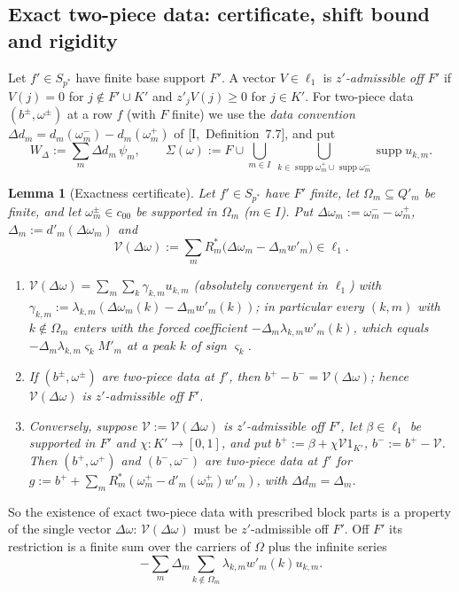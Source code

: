 \documentclass[10pt]{amsart}
\newtheorem{lemma}[theorem]{Lemma}
\theoremstyle{definition}
\theoremstyle{remark}
\newcommand{\supp}{\operatorname{supp}}
\begin{document}
\subsection{Exact two-piece data: certificate, shift bound and rigidity}\label{subsec:II-rigid}

Let $f'\in S_{p^*}$ have finite base support $F'$.  A vector $V\in\ell_1$ is
\emph{$z'$-admissible off $F'$} if $V(j)=0$ for $j\notin F'\cup K'$ and
$z'_jV(j)\ge0$ for $j\in K'$.  For two-piece data $(b^\pm,\omega^\pm)$ at a
row $f$ (with $F$ finite) we use the \emph{data convention}
$\Delta d_m=d_m(\omega^-_m)-d_m(\omega^+_m)$ of [I,~Definition~7.7], and put
\[
 W_\Delta:=\sum_m\Delta d_m\,\psi_m,\qquad
 \Sigma(\omega):=F\cup\bigcup_{m\in I}\ \bigcup_{k\in\supp\omega^+_m\cup
 \supp\omega^-_m}\supp u_{k,m}.
\]

\begin{lemma}[Exactness certificate]\label{lem:II-cert}
Let $f'\in S_{p^*}$ have $F'$ finite, let $\Omega_m\subseteq Q'_m$ be finite,
and let $\omega^\pm_m\in c_{00}$ be supported in $\Omega_m$ \textup{(}$m\in
I$\textup{)}.  Put $\Delta\omega_m:=\omega^-_m-\omega^+_m$,
$\Delta_m:=d'_m(\Delta\omega_m)$ and
\[
 \mathcal V(\Delta\omega):=\sum_mR_m^*\big(\Delta\omega_m-\Delta_mw'_m\big)\in
 \ell_1 .
\]
\begin{enumerate}
\item[(a)] $\mathcal V(\Delta\omega)=\sum_m\sum_k\gamma_{k,m}u_{k,m}$
\textup{(}absolutely convergent in $\ell_1$\textup{)} with
$\gamma_{k,m}:=\lambda_{k,m}(\Delta\omega_m(k)-\Delta_mw'_m(k))$; in
particular every $(k,m)$ with $k\notin\Omega_m$ enters with the forced
coefficient $-\Delta_m\lambda_{k,m}w'_m(k)$, which equals
$-\Delta_m\lambda_{k,m}\varsigma_kM'_m$ at a peak $k$ of sign $\varsigma_k$.
\item[(b)] If $(b^\pm,\omega^\pm)$ are two-piece data at $f'$, then
$b^+-b^-=\mathcal V(\Delta\omega)$; hence $\mathcal V(\Delta\omega)$ is
$z'$-admissible off $F'$.
\item[(c)] Conversely, suppose $\mathcal V:=\mathcal V(\Delta\omega)$ is
$z'$-admissible off $F'$, let $\beta\in\ell_1$ be supported in $F'$ and
$\chi:K'\to[0,1]$, and put $b^+:=\beta+\chi\mathcal V1_{K'}$, $b^-:=b^+-
\mathcal V$.  Then $(b^+,\omega^+)$ and $(b^-,\omega^-)$ are two-piece data at
$f'$ for $g:=b^++\sum_mR_m^*(\omega^+_m-d'_m(\omega^+_m)w'_m)$, with
$\Delta d_m=\Delta_m$.
\end{enumerate}
\end{lemma}

So the existence of exact two-piece data with prescribed block parts is a
property of the single vector $\Delta\omega$: $\mathcal V(\Delta\omega)$ must
be $z'$-admissible off $F'$.  Off $F'$ its restriction is a finite sum over
the carriers of $\Omega$ plus the infinite series
\[
 -\sum_m\Delta_m\sum_{k\notin\Omega_m}\lambda_{k,m}w'_m(k)u_{k,m}.
\]
\end{document}
